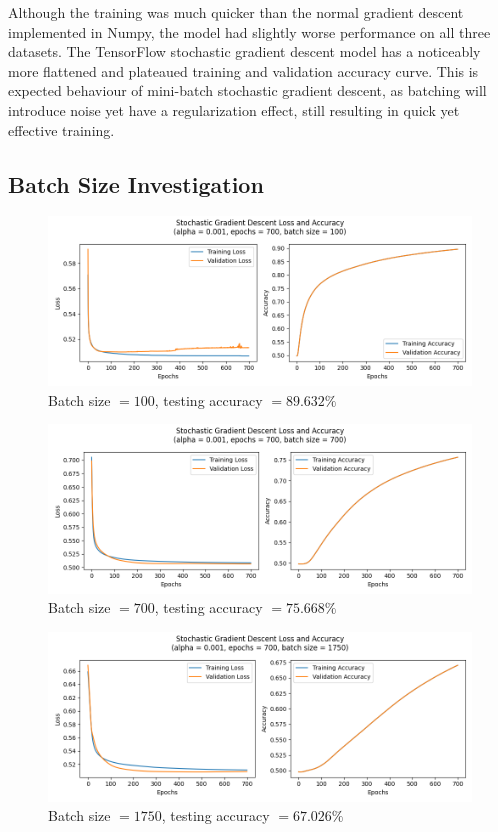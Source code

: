 \documentclass[letter]{article}
\begin{document}
Although the training was much quicker than the normal gradient descent implemented in Numpy, the model had slightly worse performance on all three datasets. The TensorFlow stochastic gradient descent model has a noticeably more flattened and plateaued training and validation accuracy curve. This is expected behaviour of mini-batch stochastic gradient descent, as batching will introduce noise yet have a regularization effect, still resulting in quick yet effective training. 

\subsection{Batch Size Investigation}

\begin{figure}[H]
	\centering
	\includegraphics[width=\linewidth]{Figure_8}
	\caption{Batch size $ = 100$, testing accuracy $ = 89.632\%$}
	\label{fig:plot8}
\end{figure}

\begin{figure}[H]
	\centering
	\includegraphics[width=\linewidth]{Figure_9}
	\caption{Batch size $ = 700$, testing accuracy $ = 75.668\%$}
	\label{fig:plot9}
\end{figure}

\begin{figure}[H]
	\centering
	\includegraphics[width=\linewidth]{Figure_10}
	\caption{Batch size $ = 1750$, testing accuracy $ = 67.026\%$}
	\label{fig:plot10}
\end{figure}
\end{document}
